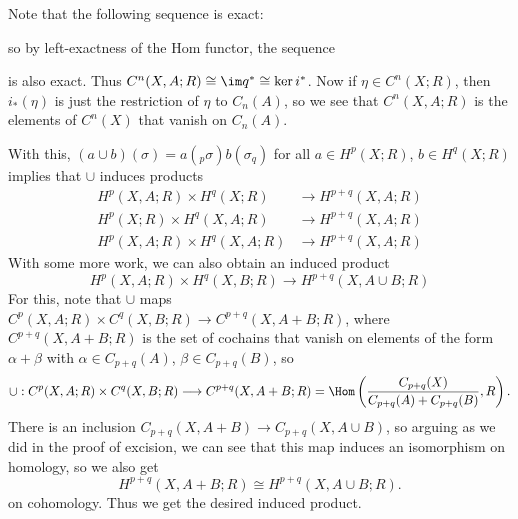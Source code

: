\begin{remark}
  Note that the following sequence is exact:
  \begin{center}
  \end{center}
  so by left-exactness of the
  Hom functor, the sequence
  \begin{center}
  \end{center}
  is also exact. Thus
  $C^n(X, A; R) \cong \im q^* \cong \ker i^*$.
  Now if $\eta \in C^n(X; R)$, then
  $i_*(\eta)$ is just the restriction
  of $\eta$ to $C_n(A)$, so we see that
  $C^n(X, A; R)$ is the elements of
  $C^n(X)$ that vanish on $C_n(A)$.

  With this, $(a \cup b)(\sigma) = a(
  {}_p \sigma) b(\sigma_q)$ for
  all $a \in H^p(X; R)$, $b \in H^q(X; R)$
  implies that $\cup$ induces products
  \begin{align*}
    H^p(X, A; R) \times H^q(X; R)
    &\longrightarrow
    H^{p+q}(X, A; R) \\
    H^p(X; R) \times H^q(X, A; R)
    &\longrightarrow
    H^{p+q}(X, A; R) \\
    H^p(X, A; R) \times H^q(X, A; R)
    &\longrightarrow
    H^{p+q}(X, A; R)
  \end{align*}
  With some more work, we can also obtain an
  induced product
  \[
    H^p(X, A; R) \times H^q(X, B; R)
    \longrightarrow H^{p+q}(X, A \cup B; R)
  \]
  For this, note that $\cup$
  maps $C^p(X, A; R) \times C^q(X, B; R) \to C^{p + q}(X, A + B; R)$,
  where $C^{p + q}(X, A + B; R)$ is the set
  of cochains that vanish on elements of
  the form $\alpha + \beta$ with
  $\alpha \in C_{p + q}(A)$, $\beta \in C_{p + q}(B)$, so
  \[
    \cup : C^p(X, A; R) \times C^q(X, B; R) \longrightarrow C^{p + q}(X, A + B; R)
    = \Hom\left(\frac{C_{p + q}(X)}{C_{p + q}(A) + C_{p + q}(B)}, R\right).
  \]
  There is an inclusion $C_{p + q}(X, A + B) \to C_{p + q}(X, A \cup B)$, so
  arguing as we did in the proof of excision,
  we can see that this map induces an
  isomorphism on homology, so we also
  get
  \[
    H^{p + q}(X, A + B; R) \cong
    H^{p + q}(X, A \cup B; R).
  \]
  on cohomology. Thus we get the desired
  induced product.
\end{remark}

